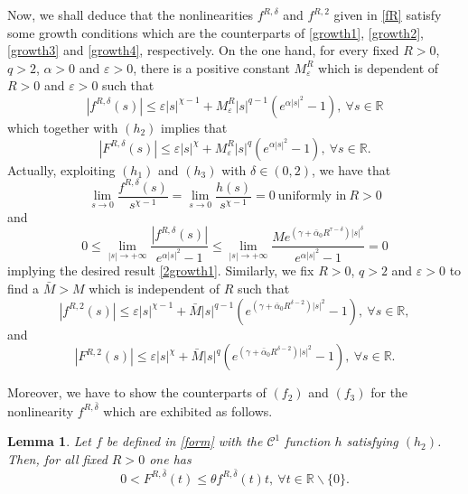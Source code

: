 \documentclass[11pt]{amsart}
\numberwithin{equation}{section}
\newtheorem{lemma}[theorem]{Lemma}
\theoremstyle{definition}
\newcommand{\R}{\mathbb{R}}
\begin{document}
Now, we shall deduce that the nonlinearities $f^{R,{\delta}}$ and $f^{R,2}$ given in \eqref{fR}
satisfy some growth conditions which are the counterparts of \eqref{growth1},
\eqref{growth2}, \eqref{growth3} and \eqref{growth4}, respectively.
On the one hand, for every fixed $R>0$, $q>2$, $\alpha>0$ and $\varepsilon>0$, there is a positive constant $M_\varepsilon^R$
which is dependent of $R>0$ and $\varepsilon>0$ such that
\begin{equation}\label{2growth1}
  |f^{R,\delta}(s)|\leq \varepsilon |s|^{\chi-1}+M_\varepsilon^R|s|^{q-1}(e^{\alpha |s|^2}-1),~\forall s\in\R
\end{equation}
which together with $(h_2)$ implies that
\begin{equation}\label{2growth2}
  |F^{R,\delta}(s)|\leq \varepsilon |s|^{\chi }+M_\varepsilon^R|s|^{q }(e^{\alpha |s|^2}-1),~\forall s\in\R.
\end{equation}
Actually, exploiting $(h_1)$ and $(h_3)$ with $\delta\in(0,2)$, we have that
\[
\lim_{s\to0}\frac{f^{R,\delta}(s)}{s^{\chi-1}}=\lim_{s\to0}\frac{h(s)}{s^{\chi-1}}=0~\text{uniformly in}~R>0
\]
and
\[
0\leq \lim_{|s|\to+\infty}\frac{|f^{R,\delta}(s)|}{e^{\alpha |s|^2}-1}\leq
\lim_{|s|\to+\infty}\frac{Me^{(\gamma+\bar{\alpha}_0R^{\tau-\delta})|s|^\delta}}{e^{\alpha |s|^2}-1}
=0
\]
implying the desired result \eqref{2growth1}.
Similarly, we fix $R>0$, $q>2$ and $\varepsilon>0$ to find a $\bar{M}>M$
which is independent of $R$ such that
\begin{equation}\label{2growth3}
  |f^{R,2}(s)|\leq \varepsilon |s|^{\chi-1}+\bar{M} |s|^{q-1}(e^{(\gamma +\bar{\alpha}_0R^{\delta-2}) |s|^2}-1),~\forall s\in\R,
\end{equation}
and
\begin{equation}\label{2growth4}
  |F^{R,2}(s)|\leq \varepsilon |s|^{\chi }+\bar{M} |s|^{q }(e^{(\gamma +\bar{\alpha}_0R^{\delta-2}) |s|^2}-1),~\forall s\in\R.
\end{equation}

Moreover, we have to show the counterparts of $(f_2)$ and $(f_3)$ for the nonlinearity $f^{R,\bar{\delta}}$
which are exhibited as follows.

\begin{lemma}\label{AR}
Let $f$ be defined in \eqref{form} with the $\mathcal{C}^1$ function $h$ satisfying $(h_2)$. Then, for all fixed $R>0$ one has
\[
0<F^{R,\bar{\delta}}(t)\leq \theta f^{R,\bar{\delta}}(t)t,~\forall t\in \R\backslash\{0\}.
\]
\end{lemma}
\end{document}
